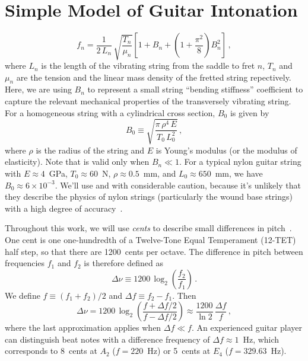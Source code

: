 %
%
%

 \section{Simple Model of Guitar Intonation\label{sct:model}}


 \begin{equation} \label{eqn:f_n_stiff}
f_n = \frac{1}{2\, L_n}\, \sqrt{\frac{T_n}{\mu_n}} \left[ 1 + B_n + \left(1 + \frac{\pi^2}{8}\right) B_n^2 \right]\, ,
 \end{equation}
where $L_n$ is the length of the vibrating string from the saddle to fret $n$, $T_n$ and $\mu_n$ are the tension and the linear mass density of the fretted string repectively. Here, we are using $B_n$ to represent a small string ``bending stiffness'' coefficient to capture the relevant mechanical properties of the transversely vibrating string. For a homogeneous string with a cylindrical cross section, $B_0$ is given by~\cite{ref:morse1981vsb}
 \begin{equation} \label{eqn:b_n_def}
B_0 \equiv \sqrt{\frac{\pi\, \rho^4\, E}{T_0\, L_0^2}}\, ,
 \end{equation}
where $\rho$ is the radius of the string and $E$ is Young's modulus (or the modulus of elasticity). Note that  is valid only when $B_n \ll 1$. For a typical nylon guitar string with $E \approx 4$~GPa, $T_0 \approx 60$~N, $\rho \approx 0.5$~mm, and $L_0 \approx 650$~mm, we have $B_0 \approx 6 \times 10^{-3}$. We'll use  and  with considerable caution, because it's unlikely that they describe the physics of nylon strings (particularly the wound base strings) with a high degree of accuracy~\cite{ref:lynchaird2017mpn}.

Throughout this work, we will use \emph{cents} to describe small differences in pitch~\cite{ref:durfee2015pms}. One cent is one one-hundredth of a Twelve-Tone Equal Temperament (12-TET) half step, so that there are 1200~cents per octave. The difference in pitch between frequencies $f_1$ and $f_2$ is therefore defined as
 \begin{equation} \label{eqn:cents_def}
\Delta \nu \equiv 1200\, \log_2\left(\frac{f_2}{f_1}\right)\, .
 \end{equation}
We define $f \equiv (f_1 + f_2) / 2$ and $\Delta f \equiv f_2 - f_1$. Then
 \begin{equation} \label{eqn:cents_approx}
\Delta \nu = 1200\, \log_2\left(\frac{f + \Delta f / 2}{f - \Delta f /2}\right) \approx \frac{1200}{\ln 2}\, \frac{\Delta f}{f}\, ,
 \end{equation}
where the last approximation applies when $\Delta f \ll f$. An experienced guitar player can distinguish beat notes with a difference frequency of $\Delta f \approx 1$~Hz, which corresponds to 8~cents at $A_2$ ($f = 220$~Hz) or 5~cents at $E_4$ ($f = 329.63$~Hz).

